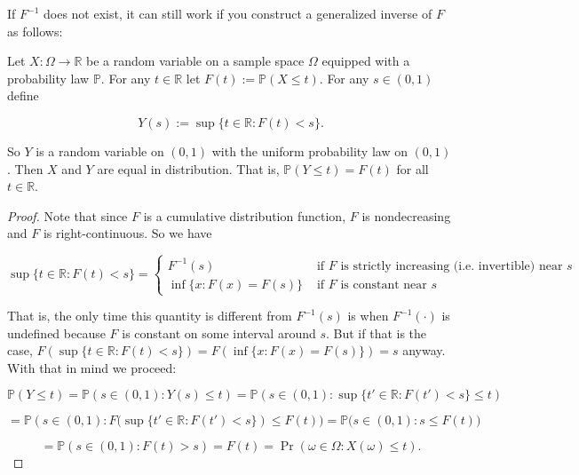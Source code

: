 \begin{remark} If \(F^{-1}\) does not exist, it can still work if you construct a generalized inverse of \(F\) as follows:

\end{remark}

\begin{proposition} Let \(X: \Omega\to\mathbb{R}\) be a random variable on a sample space $\Omega$ equipped with a probability law \(\mathbb{P}\).  For any $t\in\mathbb{R}$ let $F(t):= \mathbb{P}(X\leq t)$.  For any $s\in(0,1)$ define

\[
Y(s):=\sup\{t\in\mathbb{R} : F(t)<s\}.
\]

So $Y$ is a random variable on $(0,1)$ with the uniform probability law on $(0,1)$. Then $X$ and $Y$ are equal in distribution. That is, $\mathbb{P}(Y\leq t)= F(t)$ for all $t\in\mathbb{R}$.

\end{proposition}

\begin{proof} Note that since \(F\) is a cumulative distribution function, \(F\) is nondecreasing and \(F\) is right-continuous. So we have


\[
\sup\{t\in\mathbb{R}: F(t)<s\}  = \begin{cases}
 F^{-1}(s) & \text{ if } F \text{ is strictly increasing (i.e. invertible) near } s \\
\inf \{ x: F(x) = F(s) \} & \text{ if } F \text{ is constant near } s
 \end{cases}
 \]
 
 
That is, the only time this quantity is different from \(F^{-1}(s)\) is when \(F^{-1}(\cdot)\) is undefined because \(F\) is constant on some interval around \(s\). But if that is the case, \(F(\sup\{t\in\mathbb{R}: F(t)<s\} )  = F( \inf \{ x: F(x) = F(s) \} ) = s\) anyway. With that in mind we proceed:

\[
\mathbb{P}(Y \leq t) = \mathbb{P}(s \in (0,1): Y(s) \leq t) = \mathbb{P}(s \in (0,1): \sup\{t'\in\mathbb{R}: F(t')<s\} \leq t)  
\]

\[
= \mathbb{P}(s \in (0,1): F \big( \sup\{t'\in\mathbb{R}: F(t')<s\}) \leq F(t) \big)   = \mathbb{P}(s \in (0,1): s \leq F(t) \big)   
\]

\[
= \mathbb{P}(s \in (0,1): F(t) > s) = F(t) = \Pr( \omega \in \Omega: X(\omega) \leq t).
\]


\end{proof}


